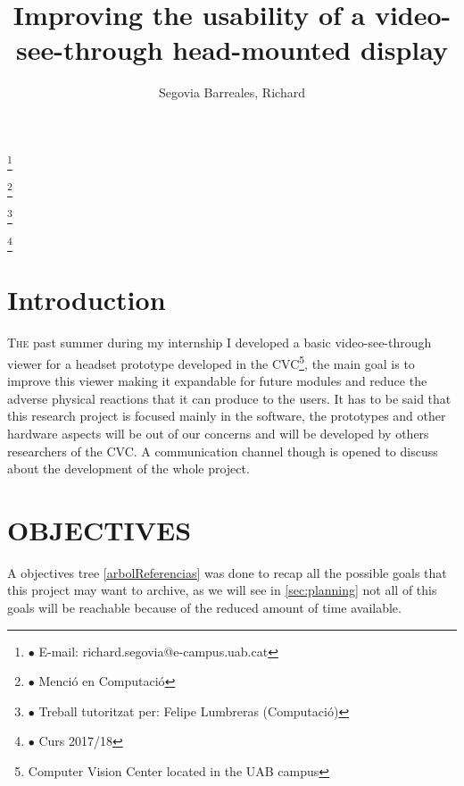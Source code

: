 \documentclass[10pt,a4paper,twocolumn,twoside]{article}
\author{\LARGE\sffamily Segovia Barreales, Richard}
\title{\Huge{\sffamily Improving the usability of a video-see-through head-mounted display}}
\date{}
\newcommand\blfootnote[1]{%
  \begingroup
  \renewcommand\thefootnote{}\footnote{#1}%
  \addtocounter{footnote}{-1}%
  \endgroup
}
\begin{document}
\fancyhead[RO]{\thepage}
\fancyhead[LE]{\thepage}

\fancyfoot[CO,CE]{}

{
   \fancyhf{}
}

\renewcommand{\headrulewidth}{0pt}
\renewcommand{\footrulewidth}{0pt}
\pagestyle{fancy}

\maketitle

\thispagestyle{primerapagina}


\blfootnote{$\bullet$ E-mail: richard.segovia@e-campus.uab.cat}
\blfootnote{$\bullet$ Menció en Computació}
\blfootnote{$\bullet$ Treball tutoritzat per: Felipe Lumbreras (Computació)}
\blfootnote{$\bullet$ Curs 2017/18}


\section{Introduction}

\lettrine[lines=3]{T}{he} past summer during my internship I developed a basic video-see-through viewer for a headset prototype developed in the CVC\footnote{Computer Vision Center located in the UAB campus}, the main goal is to improve this viewer making it expandable for future modules and reduce the adverse physical reactions that it can produce to the users\cite{disconfortReview}. It has to be said that this research project is focused mainly in the software, the prototypes and other hardware aspects will be out of our concerns and will be developed by others researchers of the CVC. A communication channel though is opened to discuss about the development of the whole project.

\section{OBJECTIVES}

A objectives tree \ref{arbolReferencias} was done to recap all the possible goals that this project may want to archive, as we will see in \ref{sec:planning}  not all of this goals will be reachable because of the reduced amount of time available. 
\end{document}
